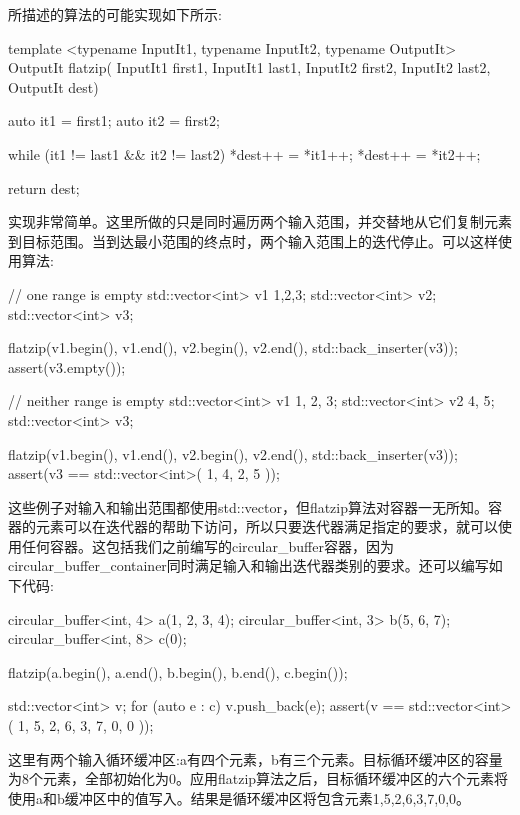 所描述的算法的可能实现如下所示:

\begin{cpp}
template <typename InputIt1, typename InputIt2,
		  typename OutputIt>
OutputIt flatzip(
	InputIt1 first1, InputIt1 last1,
	InputIt2 first2, InputIt2 last2,
	OutputIt dest)
{
	auto it1 = first1;
	auto it2 = first2;
	
	while (it1 != last1 && it2 != last2)
	{
		*dest++ = *it1++;
		*dest++ = *it2++;
	}

	return dest;
}
\end{cpp}

实现非常简单。这里所做的只是同时遍历两个输入范围，并交替地从它们复制元素到目标范围。当到达最小范围的终点时，两个输入范围上的迭代停止。可以这样使用算法:

\begin{cpp}
// one range is empty
std::vector<int> v1 {1,2,3};
std::vector<int> v2;
std::vector<int> v3;

flatzip(v1.begin(), v1.end(), v2.begin(), v2.end(),
		std::back_inserter(v3));
assert(v3.empty());

// neither range is empty
std::vector<int> v1 {1, 2, 3};
std::vector<int> v2 {4, 5};
std::vector<int> v3;

flatzip(v1.begin(), v1.end(), v2.begin(), v2.end(),
		std::back_inserter(v3));
assert(v3 == std::vector<int>({ 1, 4, 2, 5 }));
\end{cpp}

这些例子对输入和输出范围都使用std::vector，但flatzip算法对容器一无所知。容器的元素可以在迭代器的帮助下访问，所以只要迭代器满足指定的要求，就可以使用任何容器。这包括我们之前编写的circular\_buffer容器，因为circular\_buffer\_container同时满足输入和输出迭代器类别的要求。还可以编写如下代码:

\begin{cpp}
circular_buffer<int, 4> a({1, 2, 3, 4});
circular_buffer<int, 3> b({5, 6, 7});
circular_buffer<int, 8> c(0);

flatzip(a.begin(), a.end(), b.begin(), b.end(), c.begin());

std::vector<int> v;
for (auto e : c)
	v.push_back(e);
assert(v == std::vector<int>({ 1, 5, 2, 6, 3, 7, 0, 0 }));
\end{cpp}

这里有两个输入循环缓冲区:a有四个元素，b有三个元素。目标循环缓冲区的容量为8个元素，全部初始化为0。应用flatzip算法之后，目标循环缓冲区的六个元素将使用a和b缓冲区中的值写入。结果是循环缓冲区将包含元素1,5,2,6,3,7,0,0。













